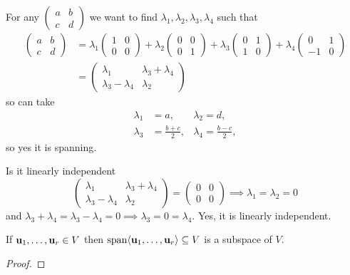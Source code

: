 \documentclass[10pt, a4paper]{article}
\begin{document}
For any $\begin{pmatrix}
    a & b \\ c & d
\end{pmatrix}$ we want to find $\lambda_1, \lambda_2, \lambda_3, \lambda_4$ such that
\begin{align*}
\begin{pmatrix}
    a & b \\ c & d
\end{pmatrix}
&=
\lambda_1\begin{pmatrix}
    1 & 0 \\ 0 & 0
\end{pmatrix} + \lambda_2\begin{pmatrix}
    0 & 0 \\ 0 & 1
\end{pmatrix} +
\lambda_3\begin{pmatrix}
    0 & 1 \\ 1 & 0
\end{pmatrix} +
\lambda_4\begin{pmatrix}
    0 & 1 \\ -1 & 0
\end{pmatrix} \\
&= \begin{pmatrix}
    \lambda_1 & \lambda_3 + \lambda_4 \\ \lambda_3 - \lambda_4 & \lambda_2
\end{pmatrix}
\end{align*}
so can take
\begin{align*}
\lambda_1 &= a, &\lambda_2 = d, \\
\lambda_3 &= \frac{b + c}{2}, &\lambda_4 = \frac{b - c}{2},
\end{align*}
so yes it is spanning.

Is it linearly independent
\[
\begin{pmatrix}
    \lambda_1 & \lambda_3 + \lambda_4 \\ \lambda_3 - \lambda_4 & \lambda_2
\end{pmatrix} = \begin{pmatrix}
    0 & 0 \\ 0 & 0
\end{pmatrix}
\implies \lambda_1 = \lambda_2 = 0
\]
and $\lambda_3 + \lambda_4 = \lambda_3 - \lambda_4 = 0 \implies \lambda_3 = 0 = \lambda_4$.
Yes,
it is linearly independent.

\begin{lemma}
    If $\mathbf{u}_1, \dotsc, \mathbf{u}_r \in V$ then $\mathrm{span}\langle\mathbf{u}_1, \dotsc, \mathbf{u}_r\rangle \subseteq V$ is a subspace of $V$.
    \begin{proof}
    \end{proof}
\end{lemma}
\end{document}
